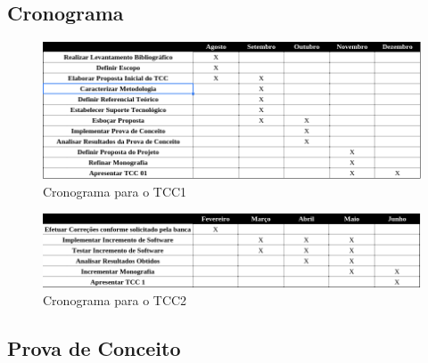  \subsection{Cronograma}
  \begin{figure}[h]
    \centering
    \includegraphics[width=\textwidth]{figuras/cronograma_tcc1.png}
    \caption{Cronograma para o TCC1}
    \label{fig:cronograma_tcc1}
  \end{figure}
  
  \begin{figure}[h]
    \centering
    \includegraphics[width=\textwidth]{figuras/cronograma_tcc2.png}
    \caption{Cronograma para o TCC2}
    \label{fig:cronograma_tcc2}
  \end{figure}

 \subsection{Prova de Conceito}

